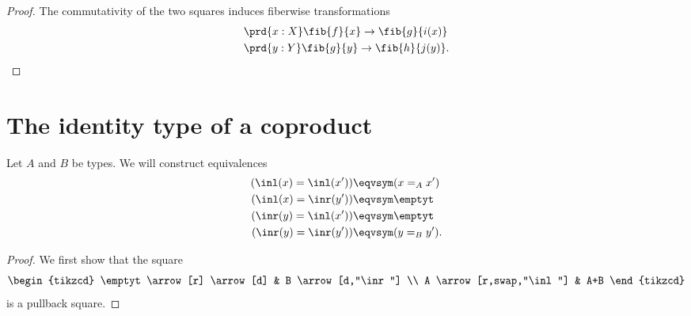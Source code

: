 \begin{proof}
The commutativity of the two squares induces fiberwise transformations
\begin{align*}
& \prd{x:X}\fib{f}{x}\to \fib{g}{i(x)} \\
& \prd{y:Y}\fib{g}{y}\to \fib{h}{j(y)}.
\end{align*}
\end{proof}

\section{The identity type of a coproduct}

\begin{thm}\label{thm:id_coprod}
Let $A$ and $B$ be types. We will construct equivalences
\begin{align*}
(\inl(x)=\inl(x')) & \eqvsym (x=_A x') \\
(\inl(x)=\inr(y')) & \eqvsym \emptyt \\
(\inr(y)=\inl(x')) & \eqvsym \emptyt \\
(\inr(y)=\inr(y')) & \eqvsym (y=_B y').
\end{align*}
\end{thm}

\begin{proof}
We first show that the square
\begin{equation*}
\begin{tikzcd}
\emptyt \arrow[r] \arrow[d] & B \arrow[d,"\inr"] \\
A \arrow[r,swap,"\inl"] & A+B
\end{tikzcd}
\end{equation*}
is a pullback square.
\end{proof}


